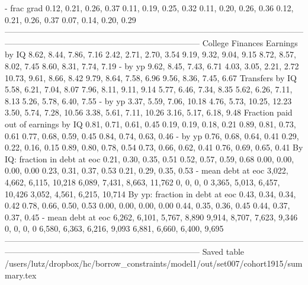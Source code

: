                            - frac grad       0.12, 0.21, 0.26, 0.37       0.11, 0.19, 0.25, 0.32   0.11, 0.20, 0.26, 0.36       0.12, 0.21, 0.26, 0.37       0.07, 0.14, 0.20, 0.29
-----------------------------------------------------------------------------------------------------------------------------------------------------------------------------------
                      College Finances                                                                                                                                             
                        Earnings by IQ       8.62, 8.44, 7.86, 7.16       2.42, 2.71, 2.70, 3.54   9.19, 9.32, 9.04, 9.15       8.72, 8.57, 8.02, 7.45       8.60, 8.31, 7.74, 7.19
                               - by yp       9.62, 8.45, 7.43, 6.71       4.03, 3.05, 2.21, 2.72  10.73, 9.61, 8.66, 8.42       9.79, 8.64, 7.58, 6.96       9.56, 8.36, 7.45, 6.67
                       Transfers by IQ       5.58, 6.21, 7.04, 8.07       7.96, 8.11, 9.11, 9.14   5.77, 6.46, 7.34, 8.35       5.62, 6.26, 7.11, 8.13       5.26, 5.78, 6.40, 7.55
                               - by yp      3.37, 5.59, 7.06, 10.18     4.76, 5.73, 10.25, 12.23  3.50, 5.74, 7.28, 10.56      3.38, 5.61, 7.11, 10.26       3.16, 5.17, 6.18, 9.48
   Fraction paid out of earnings by IQ       0.81, 0.71, 0.61, 0.45       0.19, 0.19, 0.18, 0.21   0.89, 0.81, 0.73, 0.61       0.77, 0.68, 0.59, 0.45       0.84, 0.74, 0.63, 0.46
                               - by yp       0.76, 0.68, 0.64, 0.41       0.29, 0.22, 0.16, 0.15   0.89, 0.80, 0.78, 0.54       0.73, 0.66, 0.62, 0.41       0.76, 0.69, 0.65, 0.41
        By IQ: fraction in debt at eoc       0.21, 0.30, 0.35, 0.51       0.52, 0.57, 0.59, 0.68   0.00, 0.00, 0.00, 0.00       0.23, 0.31, 0.37, 0.53       0.21, 0.29, 0.35, 0.53
                    - mean debt at eoc  3,022, 4,662, 6,115, 10,218  6,089, 7,431, 8,663, 11,762               0, 0, 0, 0  3,365, 5,013, 6,457, 10,426  3,052, 4,561, 6,215, 10,714
        By yp: fraction in debt at eoc       0.43, 0.34, 0.34, 0.42       0.78, 0.66, 0.50, 0.53   0.00, 0.00, 0.00, 0.00       0.44, 0.35, 0.36, 0.45       0.44, 0.37, 0.37, 0.45
                    - mean debt at eoc   6,262, 6,101, 5,767, 8,890   9,914, 8,707, 7,623, 9,346               0, 0, 0, 0   6,580, 6,363, 6,216, 9,093   6,881, 6,660, 6,400, 9,695
-----------------------------------------------------------------------------------------------------------------------------------------------------------------------------------
Saved table  /users/lutz/dropbox/hc/borrow_constraints/model1/out/set007/cohort1915/summary.tex 
